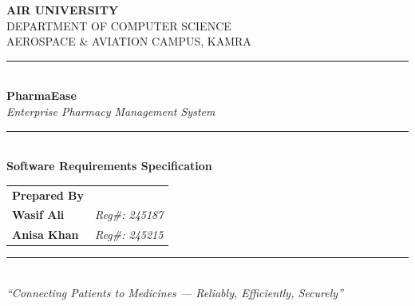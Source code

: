\documentclass[12pt,a4paper]{report}
\begin{document}
\begin{titlepage}
\pagecolor{pharmaDark}
\color{white}
\centering
\vspace*{1cm}

{\LARGE\bfseries\color{pharmaGold} AIR UNIVERSITY}\\[0.2cm]
{\Large DEPARTMENT OF COMPUTER SCIENCE}\\[0.1cm]
{\large AEROSPACE \& AVIATION CAMPUS, KAMRA}\\[0.8cm]
{\color{pharmaGold}\rule{14cm}{1.5pt}}\\[2.0cm]

{\fontsize{55}{65}\selectfont\bfseries PharmaEase}\\[0.5cm]
{\LARGE\itshape\color{pharmaGold} Enterprise Pharmacy Management System}\\[1.5cm]
{\color{pharmaGold}\rule{16cm}{3pt}}\\[1.5cm]

{\Huge\bfseries Software Requirements Specification}\\[0.4cm]

\vspace{0.4cm}
\begin{center}
\hspace*{1cm}
\begin{tabular}{p{4cm} p{5cm}}
\multicolumn{1}{c}{
{\Large\bfseries Prepared By} }
\\[1cm]   %
{\Large \textbf{Wasif Ali}} & {\Large \textit{Reg\#: 245187}}
\\[0.4cm] %
{\Large \textbf{Anisa Khan}} & {\Large \textit{Reg\#: 245215}}
\end{tabular}
\end{center}

\vfill
{\color{pharmaGold}\rule{12cm}{1pt}}\\[0.6cm]
{\large\itshape ``Connecting Patients to Medicines --- Reliably, Efficiently, Securely''}
\vspace*{1cm}
\end{titlepage}

\nopagecolor

\end{document}
